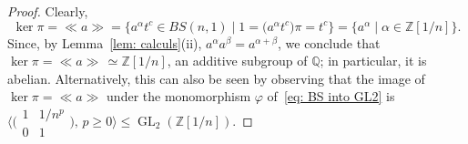 \documentclass[english]{amsart}
\theoremstyle{definition}
\newcommand\ZZ{\mathbb{Z}}
\newcommand{\QQ}{{\mathbb Q}}
\newcommand{\GL}{\operatorname{GL}}
\newcommand{\gen}[1]{\left\langle#1\right\rangle}
\newcommand{\ncl}[1]{\ll \!#1 \!\gg}
\begin{document}
\begin{proof}
Clearly, 
 $$
\ker \pi =\ncl{a} =\{a^{\alpha}t^c\in BS(n,1) \mid 1=\big(a^{\alpha}t^c\big)\pi =t^c\}=\{a^{\alpha} \mid \alpha\in \ZZ[1/n]\}.
 $$
Since, by Lemma~\ref{lem: calculs}(ii),  $a^{\alpha}a^{\beta}=a^{\alpha+\beta}$, we conclude that $\ker \pi =\ncl{a} \,\simeq \ZZ[1/n]$, an additive subgroup of $\QQ$; in particular, it is abelian. Alternatively, this can also be seen by observing that the image of $\ker \pi =\ncl{a}$ under the monomorphism $\varphi$ of~\eqref{eq: BS into GL2} is $\langle \big( \begin{smallmatrix} 1 & 1/n^p \\ 0 & 1 \end{smallmatrix} \big), \, p\geq 0\rangle \leqslant \GL_2(\ZZ[1/n])$.
%
\end{proof}
\end{document}
